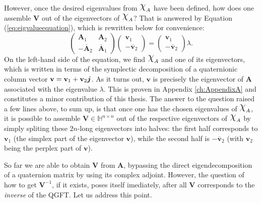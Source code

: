 However, once the desired eigenvalues from $\rchi_A$ have been defined, how does one assemble $\mathbf{V}$ out of the eigenvectors of $\rchi_A$? That is answered by Equation (\ref{eq:eigvalueequation}), which is rewritten below for convenience:
\begin{equation*}
    \begin{pmatrix}
        \mathbf{A}_1              & \mathbf{A}_2            \\
        - \overline{\mathbf{A}}_2 & \overline{\mathbf{A}}_1
    \end{pmatrix}
    \begin{pmatrix}
        \mathbf{v}_1 \\
        - \overline{\mathbf{v}}_2
    \end{pmatrix} =
    \begin{pmatrix}
        \mathbf{v}_1 \\
        - \overline{\mathbf{v}}_2
    \end{pmatrix}
    \lambda.
\end{equation*}
On the left-hand side of the equation, we find $\rchi_A$ and one of its eigenvectors, which is written in terms of the symplectic decomposition of a quaternionic column vector $\mathbf{v} = \mathbf{v}_1 + \mathbf{v}_2 \boldsymbol{j}$. As it turns out, $\mathbf{v}$ is precisely the eigenvector of $\mathbf{A}$ associated with the eigenvalue $\lambda$. This is proven in Appendix \ref{ch:AppendixA} and constitutes a minor contribution of this thesis. The answer to the question raised a few lines above, to sum up, is that once one has the chosen eigenvalues of $\rchi_A$, it is possible to assemble $\mathbf{V} \in \mathbb{H}^{n \times n}$ out of the respective eigenvectors of $\rchi_A$ by simply spliting these $2n$-long eigenvectors into halves: the first half corresponds to $\mathbf{v}_1$ (the simplex part of the eigenvector $\mathbf{v}$), while the second half is $- \overline{\mathbf{v}}_2$ (with $\mathbf{v}_2$ being the perplex part of $\mathbf{v}$).

So far we are able to obtain $\mathbf{V}$ from $\mathbf{A}$, bypassing the direct eigendecomposition of a quaternion matrix by using its complex adjoint. However, the question of how to get $\mathbf{V}^{-1}$, if it exists, poses itself imediately, after all $\mathbf{V}$ corresponds to the \textit{inverse} of the QGFT. Let us address this point.

